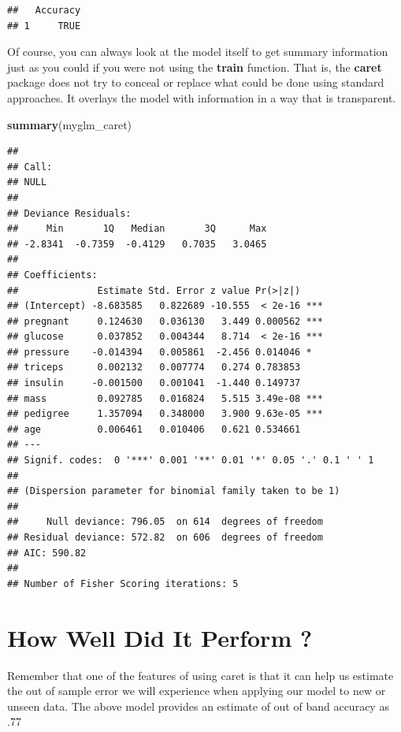 \documentclass[]{book}
\newenvironment{Shaded}{\begin{snugshade}}{\end{snugshade}}
\newcommand{\KeywordTok}[1]{\textcolor[rgb]{0.13,0.29,0.53}{\textbf{#1}}}
\newcommand{\NormalTok}[1]{#1}
\begin{document}
\begin{verbatim}
##   Accuracy
## 1     TRUE
\end{verbatim}

Of course, you can always look at the model itself to get summary
information just as you could if you were not using the \textbf{train}
function. That is, the \textbf{caret} package does not try to conceal or
replace what could be done using standard approaches. It overlays the
model with information in a way that is transparent.

\begin{Shaded}
\begin{Highlighting}[]
\KeywordTok{summary}\NormalTok{(myglm_caret)}
\end{Highlighting}
\end{Shaded}

\begin{verbatim}
## 
## Call:
## NULL
## 
## Deviance Residuals: 
##     Min       1Q   Median       3Q      Max  
## -2.8341  -0.7359  -0.4129   0.7035   3.0465  
## 
## Coefficients:
##              Estimate Std. Error z value Pr(>|z|)    
## (Intercept) -8.683585   0.822689 -10.555  < 2e-16 ***
## pregnant     0.124630   0.036130   3.449 0.000562 ***
## glucose      0.037852   0.004344   8.714  < 2e-16 ***
## pressure    -0.014394   0.005861  -2.456 0.014046 *  
## triceps      0.002132   0.007774   0.274 0.783853    
## insulin     -0.001500   0.001041  -1.440 0.149737    
## mass         0.092785   0.016824   5.515 3.49e-08 ***
## pedigree     1.357094   0.348000   3.900 9.63e-05 ***
## age          0.006461   0.010406   0.621 0.534661    
## ---
## Signif. codes:  0 '***' 0.001 '**' 0.01 '*' 0.05 '.' 0.1 ' ' 1
## 
## (Dispersion parameter for binomial family taken to be 1)
## 
##     Null deviance: 796.05  on 614  degrees of freedom
## Residual deviance: 572.82  on 606  degrees of freedom
## AIC: 590.82
## 
## Number of Fisher Scoring iterations: 5
\end{verbatim}

\section{How Well Did It Perform ?}\label{how-well-did-it-perform}

Remember that one of the features of using caret is that it can help us
estimate the out of sample error we will experience when applying our
model to new or unseen data. The above model provides an estimate of out
of band accuracy as .77
\end{document}
